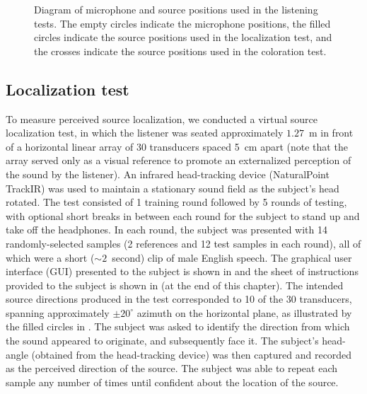 \begin{figure}[t]
\centering
  
  \caption[Diagram of microphone and source positions used in the listening tests.]{
  Diagram of microphone and source positions used in the listening tests.
  The empty circles indicate the microphone positions,
  the filled circles indicate the source positions used in the localization test, and
  the crosses indicate the source positions used in the coloration test.}
  \label{fig:Test_Geometry}
\end{figure}

\subsection{Localization test}\label{sec:05_Proposed_Models:Localization_Test}
To measure perceived source localization, we conducted a virtual source localization test, in which the listener was seated approximately $1.27$~m in front of a horizontal linear array of 30 transducers spaced 5~cm apart (note that the array served only as a visual reference to promote an externalized perception of the sound by the listener).
An infrared head-tracking device (NaturalPoint TrackIR) was used to maintain a stationary sound field as the subject's head rotated.
The test consisted of 1 training round followed by 5 rounds of testing, with optional short breaks in between each round for the subject to stand up and take off the headphones.
In each round, the subject was presented with 14 randomly-selected samples (2 references and 12 test samples in each round), all of which were a short ($\sim2$~second) clip of male English speech.
The graphical user interface (GUI) presented to the subject is shown in  and the sheet of instructions provided to the subject is shown in  (at the end of this chapter).
The intended source directions produced in the test corresponded to 10 of the 30 transducers, spanning approximately $\pm20^\circ$ azimuth on the horizontal plane, as illustrated by the filled circles in .
The subject was asked to identify the direction from which the sound appeared to originate, and subsequently face it.
The subject's head-angle (obtained from the head-tracking device) was then captured and recorded as the perceived direction of the source.
The subject was able to repeat each sample any number of times until confident about the location of the source.

